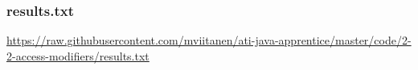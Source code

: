 \vspace{1em}
\subsubsection*{results.txt}
\noindent
\begin{minipage}{.6in}
\end{minipage}
\begin{minipage}{6in}
  \url{https://raw.githubusercontent.com/mviitanen/ati-java-apprentice/master/code/2-2-access-modifiers/results.txt}
\end{minipage}